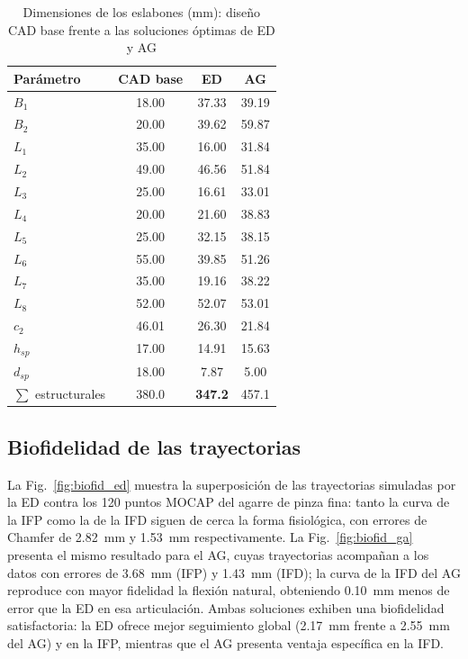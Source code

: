 \documentclass[conference]{IEEEtran}
\begin{document}
\begin{table}[htbp]
\caption{Dimensiones de los eslabones (mm): diseño CAD base frente a las
soluciones óptimas de ED y AG}
\begin{center}
\begin{tabular}{|l|c|c|c|}
\hline
\textbf{Parámetro} & \textbf{CAD base} & \textbf{ED} & \textbf{AG} \\
\hline
$B_1$  & 18.00 & 37.33 & 39.19 \\
\hline
$B_2$  & 20.00 & 39.62 & 59.87 \\
\hline
$L_1$  & 35.00 & 16.00 & 31.84 \\
\hline
$L_2$  & 49.00 & 46.56 & 51.84 \\
\hline
$L_3$  & 25.00 & 16.61 & 33.01 \\
\hline
$L_4$  & 20.00 & 21.60 & 38.83 \\
\hline
$L_5$  & 25.00 & 32.15 & 38.15 \\
\hline
$L_6$  & 55.00 & 39.85 & 51.26 \\
\hline
$L_7$  & 35.00 & 19.16 & 38.22 \\
\hline
$L_8$  & 52.00 & 52.07 & 53.01 \\
\hline
$c_2$  & 46.01 & 26.30 & 21.84 \\
\hline
$h_{sp}$ & 17.00 & 14.91 & 15.63 \\
\hline
$d_{sp}$ & 18.00 & \phantom{0}7.87 & \phantom{0}5.00 \\
\hline
$\sum$ estructurales & 380.0 & \textbf{347.2} & 457.1 \\
\hline
\end{tabular}
\label{tab:dimensiones}
\end{center}
\end{table}

\subsection{Biofidelidad de las trayectorias}
La Fig.~\ref{fig:biofid_ed} muestra la superposición de las trayectorias
simuladas por la ED contra los 120 puntos MOCAP del agarre de pinza fina: tanto
la curva de la IFP como la de la IFD siguen de cerca la forma fisiológica, con
errores de Chamfer de 2.82~mm y 1.53~mm respectivamente. La
Fig.~\ref{fig:biofid_ga} presenta el mismo resultado para el AG, cuyas
trayectorias acompañan a los datos con errores de 3.68~mm (IFP) y 1.43~mm (IFD);
la curva de la IFD del AG reproduce con mayor fidelidad la flexión natural,
obteniendo 0.10~mm menos de error que la ED en esa articulación. Ambas soluciones
exhiben una biofidelidad satisfactoria: la ED ofrece mejor seguimiento global
(2.17~mm frente a 2.55~mm del AG) y en la IFP, mientras que el AG presenta
ventaja específica en la IFD.
\end{document}
